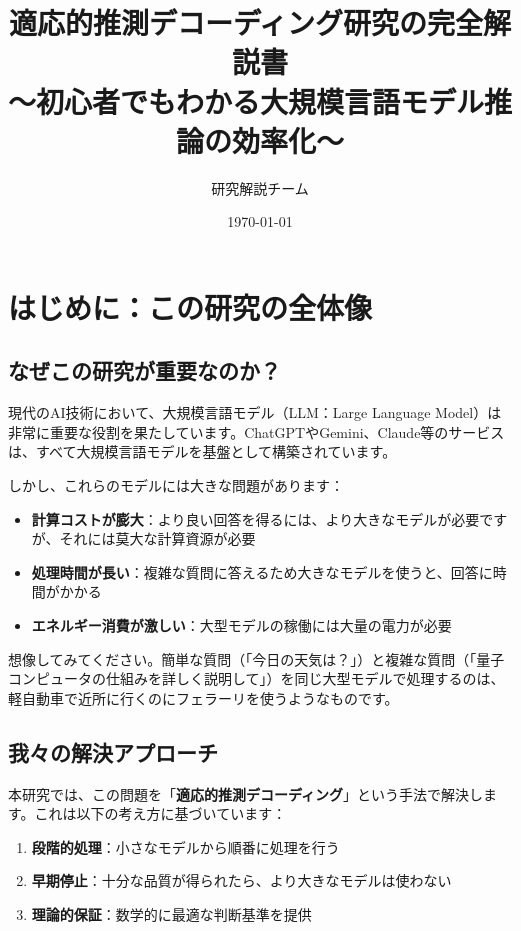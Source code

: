 \documentclass[a4paper,12pt]{jsarticle}
\title{\LARGE \textbf{適応的推測デコーディング研究の完全解説書} \\
\large 〜初心者でもわかる大規模言語モデル推論の効率化〜}
\author{研究解説チーム}
\date{\today}
\begin{document}
\maketitle

\tableofcontents
\newpage

\section{はじめに：この研究の全体像}

\subsection{なぜこの研究が重要なのか？}

現代のAI技術において、大規模言語モデル（LLM：Large Language Model）は非常に重要な役割を果たしています。ChatGPTやGemini、Claude等のサービスは、すべて大規模言語モデルを基盤として構築されています。

しかし、これらのモデルには大きな問題があります：

\begin{itemize}
\item \textbf{計算コストが膨大}：より良い回答を得るには、より大きなモデルが必要ですが、それには莫大な計算資源が必要
\item \textbf{処理時間が長い}：複雑な質問に答えるため大きなモデルを使うと、回答に時間がかかる
\item \textbf{エネルギー消費が激しい}：大型モデルの稼働には大量の電力が必要
\end{itemize}

想像してみてください。簡単な質問（「今日の天気は？」）と複雑な質問（「量子コンピュータの仕組みを詳しく説明して」）を同じ大型モデルで処理するのは、軽自動車で近所に行くのにフェラーリを使うようなものです。

\subsection{我々の解決アプローチ}

本研究では、この問題を「\textbf{適応的推測デコーディング}」という手法で解決します。これは以下の考え方に基づいています：

\begin{enumerate}
\item \textbf{段階的処理}：小さなモデルから順番に処理を行う
\item \textbf{早期停止}：十分な品質が得られたら、より大きなモデルは使わない
\item \textbf{理論的保証}：数学的に最適な判断基準を提供
\end{enumerate}
\end{document}
